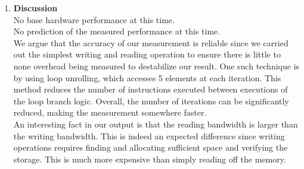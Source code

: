 \begin{enumerate}[\bfseries (a), wide, labelwidth=!, labelindent=0pt]
\begin{table}[h]
    \end{table}
    \item \textbf{Discussion}\\
    No base hardware performance at this time.\\
    No prediction of the measured performance at this time.\\
    We argue that the accuracy of our measurement is reliable since we carried out the simplest writing and reading operation to ensure there is little to none overhead being measured to destabilize our result. One such technique is by using loop unrolling, which accesses 5 elements at each iteration. This method reduces the number of instructions executed between executions of the loop branch logic. Overall, the number of iterations can be significantly reduced, making the measurement somewhere faster.\\
    An interesting fact in our output is that the reading bandwidth is larger than the writing bandwidth. This is indeed an expected difference since writing operations requires finding and allocating sufficient space and verifying the storage. This is much more expensive than simply reading off the memory.

\end{enumerate}
\newline
